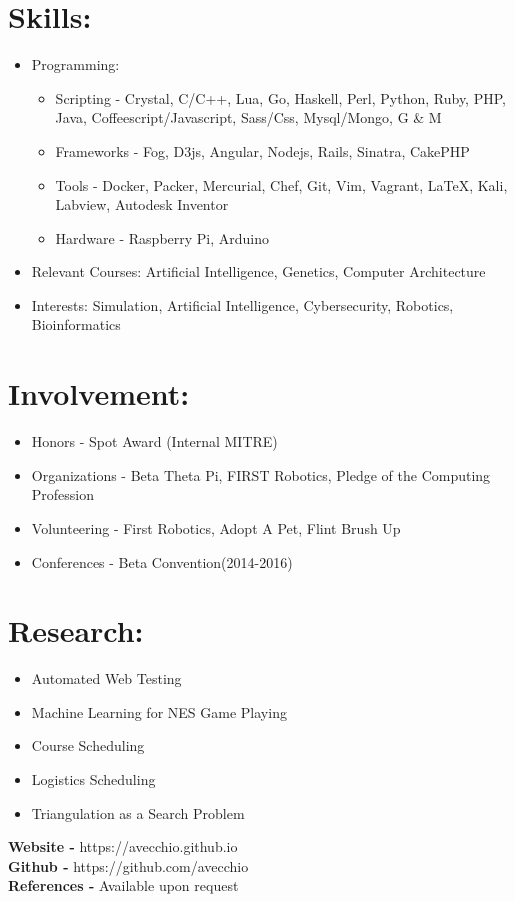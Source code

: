 \documentclass{res}
\begin{document}
\section{Skills:}
\begin{itemize}[leftmargin=*]
\item Programming:
\begin{itemize}[label=$\circ$]
\item Scripting - Crystal, C/C++, Lua, Go, Haskell, Perl, Python, Ruby, PHP, Java, Coffeescript/Javascript, Sass/Css, Mysql/Mongo, G \& M
\item Frameworks - Fog, D3js, Angular, Nodejs, Rails, Sinatra, CakePHP
\item Tools - Docker, Packer, Mercurial, Chef, Git, Vim, Vagrant, \LaTeX, Kali, Labview, Autodesk Inventor
\item Hardware - Raspberry Pi, Arduino
\end{itemize}
\item Relevant Courses: Artificial Intelligence, Genetics, Computer Architecture
\item Interests: Simulation, Artificial Intelligence, Cybersecurity, Robotics, Bioinformatics
\end{itemize}

\section{Involvement:}
\begin{itemize}[leftmargin=*]
\item Honors - Spot Award (Internal MITRE)
\item Organizations - Beta Theta Pi, FIRST Robotics, Pledge of the Computing Profession
\item Volunteering - First Robotics, Adopt A Pet, Flint Brush Up
\item Conferences - Beta Convention(2014-2016)%
\end{itemize}

\section{Research:}
\begin{itemize}[leftmargin=*]
\item Automated Web Testing
\item Machine Learning for NES Game Playing
\item Course Scheduling
\item Logistics Scheduling
\item Triangulation as a Search Problem
\end{itemize}

\begin{center}
\textbf{Website - }https://avecchio.github.io\\
\textbf{Github - }https://github.com/avecchio\\
\textbf{References - }Available upon request
\end{center}
\end{document}
